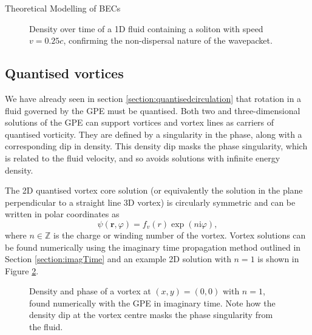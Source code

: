\begin{chapter}{\label{cha:theoretical_model}Theoretical Modelling of BECs}
\begin{figure}[!ht]
  \caption{Density over time of a 1D fluid containing a soliton with speed $v=0.25c$, confirming the non-dispersal nature of the wavepacket.}\label{fig_solitonmove}
 \end{figure}


\subsection{\label{section:vortices} Quantised vortices}
We have already seen in section \ref{section:quantisedcirculation} that rotation in a fluid governed by the GPE must be quantised. Both two and three-dimensional solutions of the GPE can support vortices and vortex lines as carriers of quantised vorticity. They are defined by a singularity in the phase, along with a corresponding dip in density. This density dip masks the phase singularity, which is related to the fluid velocity, and so avoids solutions with infinite energy density.

The 2D quantised vortex core solution (or equivalently the solution in the plane perpendicular to a straight line 3D vortex) is circularly symmetric and can be written in polar coordinates as
	\begin{equation}\label{eq_vortexsol}
	\psi(\mathbf{r},\varphi) = f_v(r)\exp(n\mathrm{i}\varphi),
	\end{equation}
where $n\in\mathbb{Z}$ is the charge or winding number of the vortex. Vortex solutions can be found numerically using the imaginary time propagation method outlined in Section \ref{section:imagTime} and an example 2D solution with $n=1$ is shown in Figure \ref{fig_vortexdensphase}.

\begin{figure}[!ht]
	\centering
  \caption{Density and phase of a vortex at $(x,y) = (0,0)$ with $n=1$, found numerically with the GPE in imaginary time. Note how the density dip at the vortex centre masks the phase singularity from the fluid. }\label{fig_vortexdensphase}
 \end{figure}


\end{chapter}
